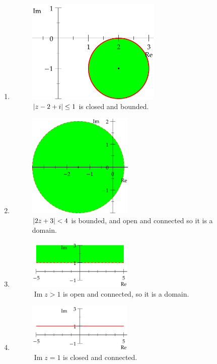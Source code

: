 \documentclass{tufte-handout}
\DeclarePairedDelimiter\abs{\lvert}{\rvert}%
\renewcommand\Im{\operatorname{Im}}
\begin{document}
\begin{enumerate}[label={(\alph*)}]
\item
  \begin{figure}
    \centering
    \includegraphics[height=5cm]{6a.pdf}
    \caption{$\abs{z-2+i} \leq 1$ is closed and bounded.}
  \end{figure}

\item
  \begin{figure}
    \centering
    \includegraphics[height=5cm]{6bold.pdf}
    \caption{$\abs{2z+3} < 4$ is bounded, and open and connected so it
      is a domain.}
  \end{figure}

\item
  \begin{figure}
    \centering
    \includegraphics[width=5cm]{6c.pdf}
    \caption{$\Im{z} > 1$ is open and connected, so it is a domain.}
  \end{figure}

\item
  \begin{figure}
    \centering
    \includegraphics[width=5cm]{6d.pdf}
    \caption{$\Im{z} = 1$ is closed and connected.}
  \end{figure}


\end{enumerate}
\end{document}
